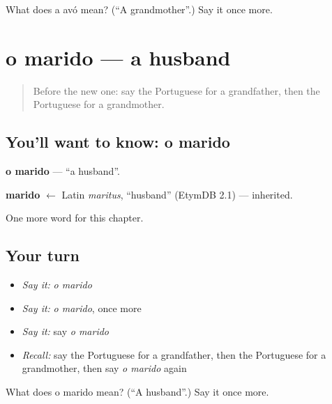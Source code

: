 \begin{tcolorbox}[breakable,colback=teal!4,colframe=teal!35!black,title={Before you move on}]
What does a avó mean? (\textquotedblleft{}A grandmother\textquotedblright{}.) Say it once more.
\end{tcolorbox}
\section[o marido]{o marido — a husband}

\label{lesson:PT-C37-marido}



\begin{quote}
Before the new one: say the Portuguese for a grandfather, then the Portuguese for a grandmother.
\end{quote}

\subsection*{You'll want to know: o marido}
\textbf{o marido} — \textquotedblleft{}a husband\textquotedblright{}.

\begin{cousinweb}
\textbf{marido} $\leftarrow$ Latin \emph{maritus}, \textquotedblleft{}husband\textquotedblright{} (EtymDB 2.1) — inherited.
\end{cousinweb}

\begin{grammarlens}[title={What you've built}]
One more word for this chapter.
\end{grammarlens}

\subsection*{Your turn}
\begin{itemize}
\raggedright
  \item \emph{Say it:} \emph{o marido}
  \item \emph{Say it:} \emph{o marido}, once more
  \item \emph{Say it:} say \emph{o marido}
  \item \emph{Recall:} say the Portuguese for a grandfather, then the Portuguese for a grandmother, then say \emph{o marido} again
\end{itemize}

\begin{tcolorbox}[breakable,colback=teal!4,colframe=teal!35!black,title={Before you move on}]
What does o marido mean? (\textquotedblleft{}A husband\textquotedblright{}.) Say it once more.
\end{tcolorbox}
